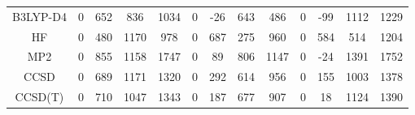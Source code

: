\begin{table}[ht]
\begin{tabular}{ccccccccccccc}
B3LYP-D4 & 0 & 652 & 836 & 1034 & 0 & -26 & 643 & 486 & 0 & -99 & 1112 & 1229 \\ 
HF & 0 & 480 & 1170 & 978 & 0 & 687 & 275 & 960 & 0 & 584 & 514 & 1204 \\ 
MP2 & 0 & 855 & 1158 & 1747 & 0 & 89 & 806 & 1147 & 0 & -24 & 1391 & 1752 \\ 
CCSD & 0 & 689 & 1171 & 1320 & 0 & 292 & 614 & 956 & 0 & 155 & 1003 & 1378 \\ 
CCSD(T) & 0 & 710 & 1047 & 1343 & 0 & 187 & 677 & 907 & 0 & 18 & 1124 & 1390 \\ 
\hline\hline
\end{tabular}
\end{table}